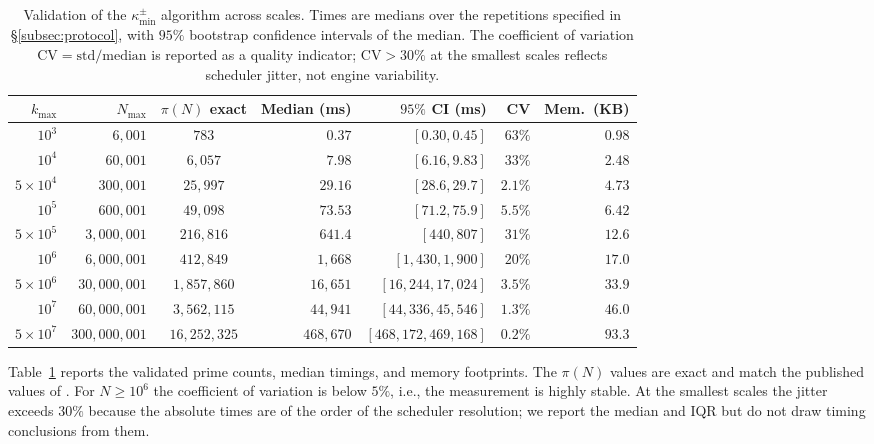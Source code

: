 \documentclass[11pt]{amsart}
\numberwithin{equation}{section}
\newcommand{\kmin}{\kappa_{\min}}
\theoremstyle{plain}
\theoremstyle{definition}
\begin{document}
\begin{table}[htbp]
\centering
\small
\caption{Validation of the $\kmin^\pm$ algorithm across scales. Times
are medians over the repetitions specified in \S\ref{subsec:protocol},
with $95\%$ bootstrap confidence intervals of the median. The
coefficient of variation $\mathrm{CV}=\mathrm{std}/\mathrm{median}$
is reported as a quality indicator; $\mathrm{CV}>30\%$ at the
smallest scales reflects scheduler jitter, not engine variability.}
\label{tab:results}
\begin{tabular}{rrcrrrr}
\toprule
$k_{\max}$ & $N_{\max}$ & $\pi(N)$ exact & Median (ms) & $95\%$ CI (ms) & CV & Mem.\ (KB) \\
\midrule
$10^3$ & $6{,}001$ & $783$ & $0.37$ & $[0.30,0.45]$ & $63\%$ & $0.98$ \\
$10^4$ & $60{,}001$ & $6{,}057$ & $7.98$ & $[6.16,9.83]$ & $33\%$ & $2.48$ \\
$5\times 10^4$ & $300{,}001$ & $25{,}997$ & $29.16$ & $[28.6,29.7]$ & $2.1\%$ & $4.73$ \\
$10^5$ & $600{,}001$ & $49{,}098$ & $73.53$ & $[71.2,75.9]$ & $5.5\%$ & $6.42$ \\
$5\times 10^5$ & $3{,}000{,}001$ & $216{,}816$ & $641.4$ & $[440,807]$ & $31\%$ & $12.6$ \\
$10^6$ & $6{,}000{,}001$ & $412{,}849$ & $1{,}668$ & $[1{,}430,1{,}900]$ & $20\%$ & $17.0$ \\
$5\times 10^6$ & $30{,}000{,}001$ & $1{,}857{,}860$ & $16{,}651$ & $[16{,}244,17{,}024]$ & $3.5\%$ & $33.9$ \\
$10^7$ & $60{,}000{,}001$ & $3{,}562{,}115$ & $44{,}941$ & $[44{,}336,45{,}546]$ & $1.3\%$ & $46.0$ \\
$5\times 10^7$ & $300{,}000{,}001$ & $16{,}252{,}325$ & $468{,}670$ & $[468{,}172,469{,}168]$ & $0.2\%$ & $93.3$ \\
\bottomrule
\end{tabular}
\end{table}

Table~\ref{tab:results} reports the validated prime counts, median
timings, and memory footprints. The $\pi(N)$ values are exact and
match the published values of \cite{OliveiraeSilva2006}. For
$N\ge 10^6$ the coefficient of variation is below $5\%$, i.e., the
measurement is highly stable. At the smallest scales the jitter
exceeds $30\%$ because the absolute times are of the order of the
scheduler resolution; we report the median and IQR but do not draw
timing conclusions from them.
\end{document}
